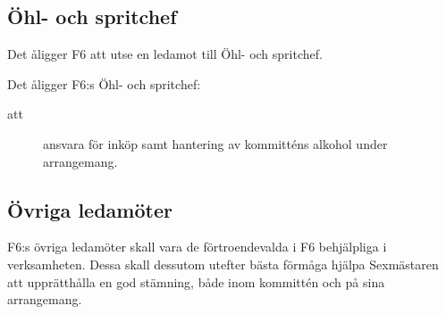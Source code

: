 \documentclass[a4paper]{article}
\begin{document}
\begin{foreningenv}{\forening{}}
    \subsection{Öhl- och spritchef}
    Det åligger F6 att utse en ledamot till Öhl- och spritchef.
    
    Det åligger F6:s Öhl- och spritchef:
    \begin{description}
        \item[att] ansvara för inköp samt hantering av kommitténs alkohol under arrangemang.
    \end{description}
    
    \subsection{Övriga ledamöter}
    F6:s övriga ledamöter skall vara de förtroendevalda i F6 behjälpliga i verksamheten. Dessa skall dessutom utefter bästa förmåga hjälpa Sexmästaren att upprätthålla en god stämning, både inom kommittén och på sina arrangemang.
\end{foreningenv}
\end{document}
